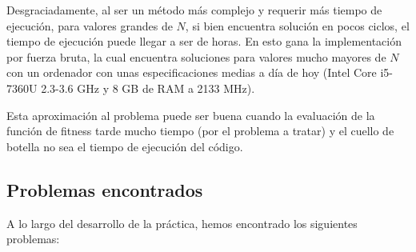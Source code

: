 \documentclass[12pt]{article}
\begin{document}
Desgraciadamente, al ser un método más complejo y requerir más tiempo de ejecución, para valores grandes de $N$, si bien encuentra solución en pocos ciclos, el tiempo de ejecución puede llegar a ser de horas. En esto gana la implementación por fuerza bruta, la cual encuentra soluciones para valores mucho mayores de $N$ con un ordenador con unas especificaciones medias a día de hoy (Intel Core i5-7360U 2.3-3.6 GHz y 8 GB de RAM a 2133 MHz).

Esta aproximación al problema puede ser buena cuando la evaluación de la función de fitness tarde mucho tiempo (por el problema a tratar) y el cuello de botella no sea el tiempo de ejecución del código.

\subsection{Problemas encontrados}

A lo largo del desarrollo de la práctica, hemos encontrado los siguientes problemas:
\end{document}
